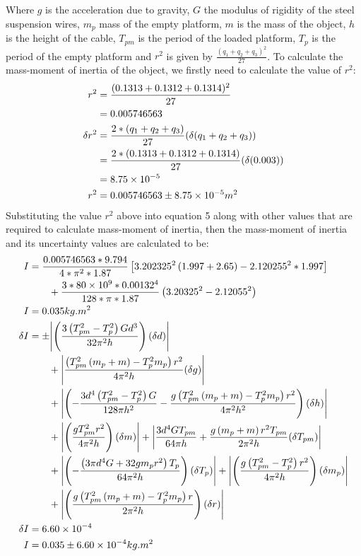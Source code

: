 Where $g$ is the acceleration due to gravity, $G$ the modulus of rigidity of the steel suspension wires, $m_p$ mass of the empty platform, $m$ is the mass of the object, $h$ is the height of the cable, $T_{pm}$ is the period of the loaded platform, $T_p$ is the period of the empty platform and $r^2$ is given by $\frac{\left(q_1 + q_2+ q_3\right)^2}{27}$. To calculate the mass-moment of inertia of the object, we firstly need to calculate the value of $r^2$:
\begin{align}
r^2 &= \frac{(0.1313 + 0.1312 + 0.1314)^2}{27} \notag \\
&= 0.005746563 \notag \\
\delta r^2 &= \frac{2*(q_1 + q_2 + q_3)}{27}(\delta (q_1 + q_2 + q_3)) \notag \\
&=\frac{2*(0.1313+0.1312+0.1314)}{27}(\delta (0.003)) \notag \\
&= 8.75 \times 10^{-5} \notag \\
r^2 &= 0.005746563 \pm 8.75 \times 10^{-5} m^2 \notag
\end{align}
Substituting the value $r^2$ above into equation 5 along with other values that are required to calculate mass-moment of inertia, then the mass-moment of inertia and its uncertainty values are calculated to be:
\begin{align}
I &= \frac{0.005746563*9.794}{4*\pi^2*1.87}\left[3.202325^2\left(1.997 + 2.65\right) - 2.120255^2*1.997\right] \notag \\
&\qquad+ \frac{3*80 \times 10^9*0.00132^4}{128*\pi*1.87}\left(3.20325^2-2.12055^2\right) \notag \\
I &= 0.035 kg.m^2 \notag \\
\delta I &= \pm \abs{\left(\dfrac{3\left(T_{pm}^2-T_p^2\right)Gd^3}{32{\pi^2}h}\right)(\delta d)} \notag \\
&\qquad + \abs{\dfrac{\left(T_{pm}^2\left(m_p+m\right)-T_p^2m_p\right)r^2}{4{\pi^2}h}(\delta g)} \notag \\
&\qquad + \abs{\left(-\dfrac{3d^4\left(T_{pm}^2-T_p^2\right)G}{128{\pi}h^2}-\dfrac{g\left(T_{pm}^2\left(m_p+m\right)-T_p^2m_p\right)r^2}{4{\pi^2}h^2}\right)(\delta h) } \notag \\
&\qquad + \abs{\left(\dfrac{gT_{pm}^2r^2}{4{\pi^2}h}\right)(\delta m)} +  \abs{\dfrac{3d^4GT_{pm}}{64{\pi}h}+\dfrac{g\left(m_p+m\right)r^2T_{pm}}{2{\pi}^2h}(\delta T_{pm})}\notag \\
&\qquad + \abs{\left(-\dfrac{\left(3{\pi}d^4G+32gm_pr^2\right)T_p}{64{\pi^2}h}\right)(\delta T_p)} + \abs{\left(\dfrac{g\left(T_{pm}^2-T_p^2\right)r^2}{4{\pi^2}h}\right)(\delta m_p)} \notag \\
&\qquad + \abs{\left(\dfrac{g\left(T_{pm}^2\left(m_p+m\right)-T_p^2m_p\right)r}{2{\pi^2}h}\right)(\delta r)} \notag \\
\delta I &= 6.60\times10^{-4} \notag \\
I &= 0.035 \pm 6.60\times10^{-4} kg.m^2 \notag
\end{align}